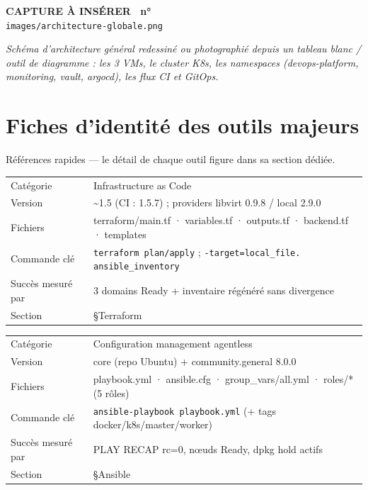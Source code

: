 \documentclass[12pt,a4paper]{article}
\newcounter{capturecount}
\newcommand{\capturebox}[2]{%
\par\vspace{4mm}
\begin{tcolorbox}[enhanced,colback=yellow!5,colframe=black!55,boxrule=0.7pt,
  borderline={0.7pt}{0pt}{black!40,dashed},
  arc=2mm,left=6pt,right=6pt,top=7pt,bottom=7pt]
\centering
{\normalsize\sffamily\bfseries CAPTURE À INSÉRER \textbar\ n°\,\stepcounter{capturecount}\thecapturecount}\\[3pt]
{\large\texttt{images/#2}}\\[7pt]
\begin{minipage}{0.94\linewidth}\centering\itshape #1\end{minipage}
\end{tcolorbox}
\par\vspace{2mm}}
\begin{document}
\capturebox{Schéma d'architecture général redessiné ou photographié depuis un tableau blanc / outil de diagramme : les 3 VMs, le cluster K8s, les namespaces (devops-platform, monitoring, vault, argocd), les flux CI et GitOps.}{architecture-globale.png}

\clearpage
\section{Fiches d'identité des outils majeurs}

Références rapides --- le détail de chaque outil figure dans sa section dédiée.

\begin{tcolorbox}[colback=gray!4,colframe=black!60,arc=1.5mm,title={\bfseries Terraform},fonttitle=\bfseries]
\small
\begin{tabular}{@{}p{2.4cm}p{10.8cm}@{}}
Catégorie & Infrastructure as Code \\
Version & \textasciitilde 1.5 (CI : 1.5.7) ; providers libvirt 0.9.8 / local 2.9.0 \\
Fichiers & terraform/main.tf · variables.tf · outputs.tf · backend.tf · templates \\
Commande clé & \texttt{terraform plan/apply} ; \texttt{-target=local\_file.} \texttt{ansible\_inventory} \\
Succès mesuré par & 3 domains Ready + inventaire régénéré sans divergence \\
Section & \S Terraform \\
\end{tabular}
\end{tcolorbox}

\begin{tcolorbox}[colback=gray!4,colframe=black!60,arc=1.5mm,title={\bfseries Ansible},fonttitle=\bfseries]
\small
\begin{tabular}{@{}p{2.4cm}p{10.8cm}@{}}
Catégorie & Configuration management agentless \\
Version & core (repo Ubuntu) + community.general 8.0.0 \\
Fichiers & playbook.yml · ansible.cfg · group\_vars/all.yml · roles/* (5 rôles) \\
Commande clé & \texttt{ansible-playbook playbook.yml} (+ tags docker/k8s/master/worker) \\
Succès mesuré par & PLAY RECAP rc=0, nœuds Ready, dpkg hold actifs \\
Section & \S Ansible \\
\end{tabular}
\end{tcolorbox}
\end{document}
